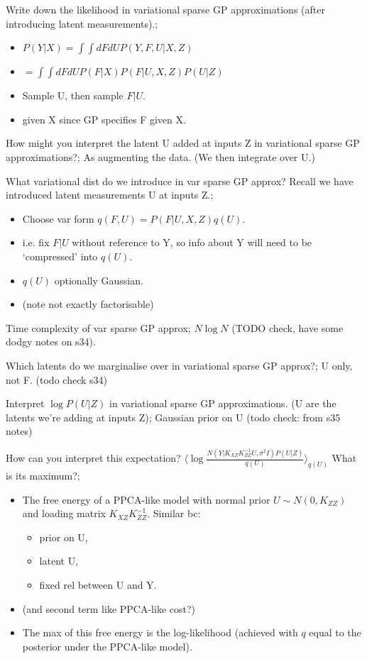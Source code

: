 \documentclass{article}
\begin{document}
Write down the likelihood in variational sparse GP approximations (after introducing latent measurements).; \begin{itemize} \item $P(Y|X)=\int \int dFdU P(Y, F, U|X, Z)$ \item $=\int \int dFdU P(F|X)P(F|U, X, Z)P(U|Z)$ \item Sample U, then sample $F|U$. \item given X since GP specifies F given X. \end{itemize}

How might you interpret the latent U added at inputs Z in variational sparse GP approximations?; As augmenting the data. (We then integrate over U.)

What variational dist do we introduce in var sparse GP approx? Recall we have introduced latent measurements U at inputs Z.; \begin{itemize} \item Choose var form $q(F, U)=P(F|U, X, Z)q(U)$.  \item i.e. fix $F|U$ without reference to Y, so info about Y will need to be `compressed' into $q(U)$. \item $q(U)$ optionally Gaussian. \item (note not exactly factorisable) \end{itemize}

Time complexity of var sparse GP approx; $N\log N$ (TODO check, have some dodgy notes on s34).

Which latents do we marginalise over in variational sparse GP approx?; U only, not F. (todo check s34)

Interpret $\log P(U|Z)$ in variational sparse GP approximations. (U are the latents we're adding at inputs Z); Gaussian prior on U (todo check: from s35 notes)

How can you interpret this expectation? $\langle \log \frac{N(Y|K_{XZ}K_{ZZ}^{-1}U, \sigma^2I)P(U|Z)}{q(U)}\rangle_{q(U)}$ What is its maximum?; \begin{itemize} \item The free energy of a PPCA-like model with normal prior $U\sim N(0, K_{ZZ})$ and loading matrix $K_{XZ}K_{ZZ}^{-1}$. Similar bc: \begin{itemize} \item prior on U, \item latent U, \item fixed rel between U and Y. \end{itemize} \item (and second term like PPCA-like cost?) \item The max of this free energy is the log-likelihood (achieved with $q$ equal to the posterior under the PPCA-like model). \end{itemize}
\end{document}
